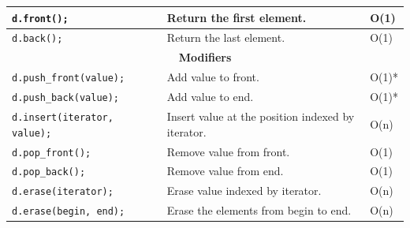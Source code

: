 \documentclass[12 pt, twoside] {article}
\begin{document}
{\begin{table}
\begin{tabular}{|l|l|l|}
\texttt{d.front();}                                 & Return the first element.                               & O(1)             \\ \hline
\texttt{d.back(); }                                 & Return the last element.                                & O(1)             \\ \hline
\multicolumn{3}{|c|}{\textbf{Modifiers}}                                                                                         \\ \hline
\texttt{d.push\_front(value);      }                & Add value to front.                                     & O(1)* \\ \hline
\texttt{d.push\_back(value);       }                & Add value to end.                                       & O(1)* \\ \hline
\texttt{d.insert(iterator, value); }                & Insert value at the position indexed by iterator.       & O(n)             \\ \hline
\texttt{d.pop\_front();            }                & Remove value from front.                                & O(1)             \\ \hline
\texttt{d.pop\_back();             }                & Remove value from end.                                  & O(1)             \\ \hline
\texttt{d.erase(iterator);         }                & Erase value indexed by iterator.                        & O(n)             \\ \hline
\texttt{d.erase(begin, end);       }                & Erase the elements from begin to end.                   & O(n)             \\ \hline
\end{tabular}
\end{table}
}
\end{document}
